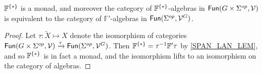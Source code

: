 \documentclass[a4paper,10pt
,draft
]{article}%
\renewcommand{\1}{\eta}%
\begin{document}
\begin{proposition}
      \label{TEST_PROP}
      $\mathbb F^{\set{\**}}$ is a monad, and moreover
      the category of $\mathbb F^{\set{\**}}$-algebras in $\mathsf{Fun}(G \times \Sigma^{op}, \mathcal V)$ is equivalent to
      the category of $\mathbb F'$-algebras in $\mathsf{Fun}(\Sigma^{op}, \mathcal V^G)$.
\end{proposition}
\begin{proof}
      Let $\tau: \tilde X \mapsto X$ denote the isomorphism of categories
      $\mathsf{Fun}(G \times \Sigma^{op}, \mathcal V) \xrightarrow{\tau} \mathsf{Fun}(\Sigma^{op}, \mathcal V^G)$.
      Then $\mathbb F^{\set{\**}} = \tau^{-1} \mathbb F' \tau$ by \ref{SPAN_LAN_LEM}, and so
      $\mathbb F^{\set{\**}}$ is in fact a monad, and
      the isomorphism lifts to an isomorphism on the category of algebras.
\end{proof}






\end{document}

